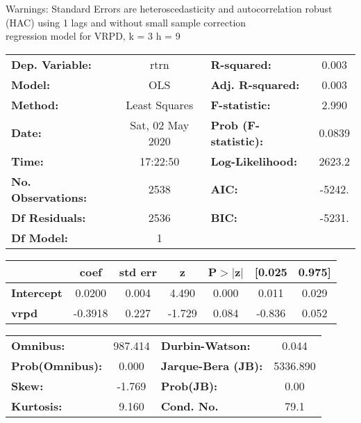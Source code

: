 Warnings: \newline
 [1] Standard Errors are heteroscedasticity and autocorrelation robust (HAC) using 1 lags and without small sample correction\\ 

regression model for VRPD, k = 3 h = 9\begin{center}
\begin{tabular}{lclc}
\toprule
\textbf{Dep. Variable:}    &       rtrn       & \textbf{  R-squared:         } &     0.003   \\
\textbf{Model:}            &       OLS        & \textbf{  Adj. R-squared:    } &     0.003   \\
\textbf{Method:}           &  Least Squares   & \textbf{  F-statistic:       } &     2.990   \\
\textbf{Date:}             & Sat, 02 May 2020 & \textbf{  Prob (F-statistic):} &   0.0839    \\
\textbf{Time:}             &     17:22:50     & \textbf{  Log-Likelihood:    } &    2623.2   \\
\textbf{No. Observations:} &        2538      & \textbf{  AIC:               } &    -5242.   \\
\textbf{Df Residuals:}     &        2536      & \textbf{  BIC:               } &    -5231.   \\
\textbf{Df Model:}         &           1      & \textbf{                     } &             \\
\bottomrule
\end{tabular}
\begin{tabular}{lcccccc}
                   & \textbf{coef} & \textbf{std err} & \textbf{z} & \textbf{P$> |$z$|$} & \textbf{[0.025} & \textbf{0.975]}  \\
\midrule
\textbf{Intercept} &       0.0200  &        0.004     &     4.490  &         0.000        &        0.011    &        0.029     \\
\textbf{vrpd}      &      -0.3918  &        0.227     &    -1.729  &         0.084        &       -0.836    &        0.052     \\
\bottomrule
\end{tabular}
\begin{tabular}{lclc}
\textbf{Omnibus:}       & 987.414 & \textbf{  Durbin-Watson:     } &    0.044  \\
\textbf{Prob(Omnibus):} &   0.000 & \textbf{  Jarque-Bera (JB):  } & 5336.890  \\
\textbf{Skew:}          &  -1.769 & \textbf{  Prob(JB):          } &     0.00  \\
\textbf{Kurtosis:}      &   9.160 & \textbf{  Cond. No.          } &     79.1  \\
\bottomrule
\end{tabular}
\end{center}

